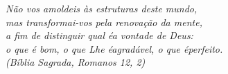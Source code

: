 \begin{epigrafe}
\vspace*{\fill}
\begin{flushright}
\textit{Não vos amoldeis às estruturas deste mundo, \\
mas transformai-vos pela renovação da mente, \\
a fim de distinguir qual éa vontade de Deus: \\
o que é bom, o que Lhe éagradável, o que éperfeito.\\
(Bíblia Sagrada, Romanos 12, 2)}
\vspace*{\fill}
\end{flushright}
\end{epigrafe}    
\clearpage{}
